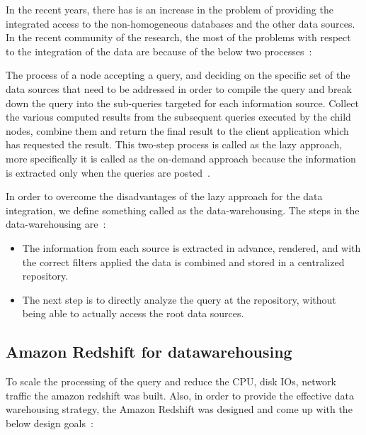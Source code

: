 In the recent years, there has is an increase in the problem of providing 
the integrated access to the non-homogeneous databases and the other data 
sources. In the recent community of the research, the most of the problems 
with respect to the integration of the data are because of the below two 
processes~\cite{hid-sp18-412-research_problems_data_warehousing}:

The process of a node accepting a query, and deciding on the specific set 
of the data sources that need to be addressed in order to compile the query 
and break down the query into the sub-queries targeted for each information 
source. Collect the various computed results from the subsequent queries 
executed by the child nodes, combine them and return the final result to the 
client application which has requested the result.
This two-step process is called as the lazy approach, 
more specifically it is called as the on-demand approach because the 
information is extracted only when the 
queries are posted~\cite{hid-sp18-412-research_problems_data_warehousing}. 

In order to overcome the disadvantages of the lazy approach for the data 
integration, we define something called as the data-warehousing. 
The steps in the 
data-warehousing are~\cite{hid-sp18-412-research_problems_data_warehousing}:

\begin{itemize}

\item The information from each source is extracted in advance, 
rendered, and with the correct filters applied the data is combined and 
stored in a centralized repository.

\item The next step is to directly analyze the query at the 
repository, without being able to actually access the root data sources. 

\end{itemize}

\subsection{Amazon Redshift for datawarehousing}

To scale the processing of the query and reduce the CPU, disk  IOs, network 
traffic the amazon redshift was built. Also, in order to provide the effective
data warehousing strategy, the Amazon Redshift was designed and come up 
with the below design goals~\cite{hid-sp18-412_Gupta_2015_ARC}:

